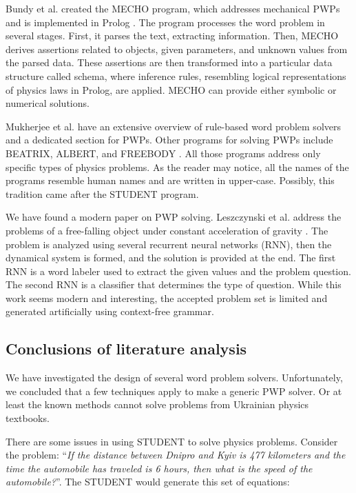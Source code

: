 \documentclass[a4paper, 12pt]{article}
\newcommand{\etext}[1]{\enquote{\textit{#1}}}
\begin{document}
	Bundy et al. created the MECHO program, which addresses mechanical PWPs
	and is implemented in Prolog \cite{mecho}. The program processes the word
	problem in several stages. First, it parses the text, extracting
	information. Then, MECHO derives assertions related to objects, given
	parameters, and unknown values from the parsed data. These assertions
	are then transformed into a particular data structure called schema,
	where inference rules, resembling logical representations of physics
	laws in Prolog, are applied. MECHO can provide either symbolic or
	numerical solutions.
	
	Mukherjee et al. have an extensive overview of rule-based word problem
	solvers and a dedicated section for PWPs. Other programs for solving
	PWPs include BEATRIX, ALBERT, and FREEBODY \cite{other_pwp}. All those programs
	address only specific types of physics problems. As the reader may
	notice, all the names of the programs resemble human names and are
	written in upper-case. Possibly, this tradition came after the STUDENT
	program.
	
	We have found a modern paper on PWP solving. Leszczynski et al. address
	the problems of a free-falling object under constant acceleration of
	gravity \cite{modern_pwp}. The problem is analyzed using several recurrent neural
	networks (RNN), then the dynamical system is formed, and the solution is
	provided at the end. The first RNN is a word labeler used to extract the
	given values and the problem question. The second RNN is a classifier
	that determines the type of question. While this work seems modern and
	interesting, the accepted problem set is limited and generated
	artificially using context-free grammar.
	
	\subsection{Conclusions of literature analysis}
	
	We have investigated the design of several word problem solvers.
	Unfortunately, we concluded that a few techniques apply to make a
	generic PWP solver. Or at least the known methods cannot solve problems
	from Ukrainian physics textbooks.
	
	There are some issues in using STUDENT to solve physics problems.
	Consider the problem: \etext{If the distance between Dnipro and Kyiv is
	477 kilometers and the time the automobile has traveled is 6 hours, then
	what is the speed of the automobile?}. The STUDENT would generate this
	set of equations:
	
\end{document}
